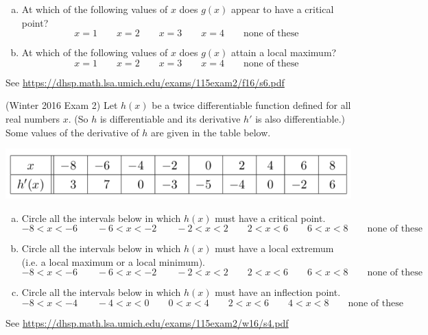 \documentclass[11pt]{exam}
\begin{document}
\begin{questions}
\begin{center}
        \end{center}
\begin{enumerate}[(a)]
	\item At which of the following values of $x$ does $g(x)$ appear to have a critical point?		
	$$x=1 \qquad x=2 \qquad x=3 \qquad x=4 \qquad \textrm{none of these}$$
	\item At which of the following values of $x$ does $g(x)$ attain a local maximum?
	$$x=1 \qquad x=2 \qquad x=3 \qquad x=4 \qquad \textrm{none of these}$$
	\end{enumerate}
        \begin{solution}
          See \href{https://dhsp.math.lsa.umich.edu/exams/115exam2/f16/s6.pdf}{https://dhsp.math.lsa.umich.edu/exams/115exam2/f16/s6.pdf}
        \end{solution}
\question (Winter 2016 Exam 2) %
	Let $h(x)$ be a twice differentiable function defined for all real numbers $x$. (So $h$ is differentiable and its derivative $h'$ is also differentiable.)
Some values of the derivative of $h$ are given in the table below.
\begin{center}
  \includegraphics[scale=0.5]{Figures/Winter2016Exam2Problem4}
\end{center}
\begin{enumerate}[(a)]
\item Circle all the intervals below in which $h(x)$ must have a critical point.
$$-8 < x < -6  \qquad -6 < x < -2 \qquad -2 < x < 2 \qquad 2 < x < 6 \qquad 6 < x < 8 \qquad \textrm{none of these}$$
\item Circle all the intervals below in which $h(x)$ must have a local extremum (i.e. a local maximum or a local minimum).
$$-8 < x < -6  \qquad -6 < x < -2 \qquad -2< x < 2 \qquad 2 < x < 6 \qquad 6< x < 8 \qquad \textrm{none of these}$$
\item Circle all the intervals below in which $h(x)$ must have an inflection point.
$$-8 < x < -4  \qquad -4 < x < 0 \qquad 0 < x < 4 \qquad 2 < x < 6 \qquad 4 < x < 8 \qquad \textrm{none of these}$$
\end{enumerate}
\begin{solution}
  See \href{https://dhsp.math.lsa.umich.edu/exams/115exam2/w16/s4.pdf}{https://dhsp.math.lsa.umich.edu/exams/115exam2/w16/s4.pdf}
\end{solution}
\end{questions}
\end{document}
